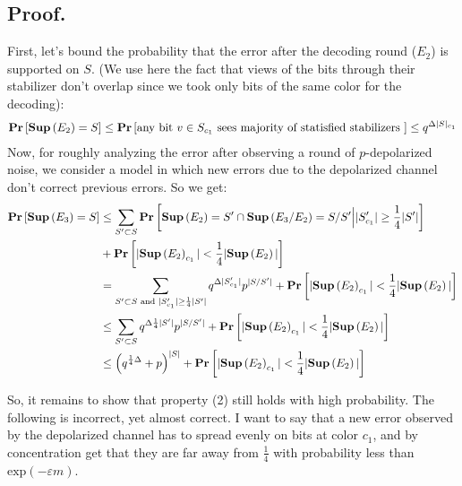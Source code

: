 \documentclass[manuscript,screen,review]{acmart}
\begin{document}
\subsection{Proof.}
First, let's bound the probability that the error after the decoding round ($E_{2}$) is supported on $S$. (We use here the fact that views of the bits through their stabilizer don't overlap since we took only bits of the same color for the decoding):
\begin{equation*}
  \begin{split}
    \mathbf{Pr} \left[  \mathbf{Sup}{} \left(E_{2}\right) = S  \right] \le \mathbf{Pr} \left[ \text{any bit } v\in S_{c_{1}} \text{ sees majority of statisfied stabilizers   }  \right] \le q^{\Delta |S|_{c_{1}}}
  \end{split}
\end{equation*}
Now, for roughly analyzing the error after observing a round of $p$-depolarized noise, we consider a model in which new errors due to the depolarized channel don't correct previous errors. So we get:
\begin{equation*}
  \begin{split}
    \mathbf{Pr} \left[  \mathbf{Sup}{} \left(E_{3}\right) = S    \right] & \le  \sum_{S^{\prime} \subset S}\mathbf{Pr} \left[   \mathbf{Sup}{} \left( E_{2} \right) = S^{\prime}  \cap \mathbf{Sup}{} \left( E_{3}/E_{2}\right) = S/S^{\prime}  \Big{|}  |S^{\prime}_{c_1}| \ge \frac{1}{4} |S^{\prime}|   \right]\\ 
    & + \mathbf{Pr} \left[   | \mathbf{Sup}{} \left( E_{2} \right)_{c_1} | < \frac{1}{4} | \mathbf{Sup}{} \left( E_{2} \right) | \right] \\
    & = \sum_{S^{\prime} \subset S \text{ and }  |S^{\prime}_{c_1}| \ge \frac{1}{4} |S^{\prime}|}{q^{\Delta |S^{\prime}_{c_1}|}p^{|S /S^{\prime}|} } +  \mathbf{Pr} \left[   | \mathbf{Sup}{} \left( E_{2} \right)_{c_1} | < \frac{1}{4} | \mathbf{Sup}{} \left( E_{2} \right) | \right] \\
    & \le \sum_{S^{\prime} \subset S }{q^{\Delta \frac{1}{4}|S^{\prime}|}p^{|S /S^{\prime}|}  } +  \mathbf{Pr} \left[   | \mathbf{Sup}{} \left( E_{2} \right)_{c_1} | < \frac{1}{4} | \mathbf{Sup}{} \left( E_{2} \right) | \right] \\
    &\le \left( q^{\frac{1}{4}\Delta} + p \right)^{|S|}  + \mathbf{Pr} \left[   | \mathbf{Sup}{} \left( E_{2} \right)_{c_1} | < \frac{1}{4} | \mathbf{Sup}{} \left( E_{2} \right) | \right] 
  \end{split}
\end{equation*}


\newcommand*{\Pt}{\mathcal{P}}


So, it remains to show that property (2) still holds with high probability. The following is incorrect, yet almost correct. I want to say that a new error observed by the depolarized channel has to spread evenly on bits at color $c_{1}$, and by concentration get that they are far away from $\frac{1}{4}$ with probability less than $\text{exp}( - \varepsilon m )$.
\end{document}
